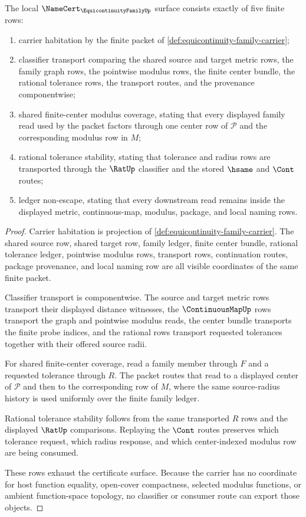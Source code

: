 \begin{theorem}
\label{thm:equicontinuity-family-namecert-obligations}
The local $\NameCert_{\EquicontinuityFamilyUp}$ surface consists exactly of
five finite rows:
\begin{enumerate}
\item carrier habitation by the finite packet of
\autoref{def:equicontinuity-family-carrier};
\item classifier transport comparing the shared source and target metric
rows, the family graph rows, the pointwise modulus rows, the finite center
bundle, the rational tolerance rows, the transport routes, and the
provenance componentwise;
\item shared finite-center modulus coverage, stating that every displayed
family read used by the packet factors through one center row of
$\mathcal{P}$ and the corresponding modulus row in $M$;
\item rational tolerance stability, stating that tolerance and radius rows
are transported through the $\RatUp$ classifier and the stored $\hsame$ and
$\Cont$ routes;
\item ledger non-escape, stating that every downstream read remains inside
the displayed metric, continuous-map, modulus, package, and local naming
rows.
\end{enumerate}
\end{theorem}
\begin{proof}
Carrier habitation is projection of
\autoref{def:equicontinuity-family-carrier}. The shared source row, shared
target row, family ledger, finite center bundle, rational tolerance ledger,
pointwise modulus rows, transport rows, continuation routes, package
provenance, and local naming row are all visible coordinates of the same
finite packet.

Classifier transport is componentwise. The source and target metric rows
transport their displayed distance witnesses, the $\ContinuousMapUp$ rows
transport the graph and pointwise modulus reads, the center bundle transports
the finite probe indices, and the rational rows transport requested
tolerances together with their offered source radii.

For shared finite-center coverage, read a family member through $F$ and a
requested tolerance through $R$. The packet routes that read to a displayed
center of $\mathcal{P}$ and then to the corresponding row of $M$, where the
same source-radius history is used uniformly over the finite family ledger.

Rational tolerance stability follows from the same transported $R$ rows and
the displayed $\RatUp$ comparisons. Replaying the $\Cont$ routes preserves
which tolerance request, which radius response, and which center-indexed
modulus row are being consumed.

These rows exhaust the certificate surface. Because the carrier has no
coordinate for host function equality, open-cover compactness, selected
modulus functions, or ambient function-space topology, no classifier or
consumer route can export those objects.
\end{proof}

